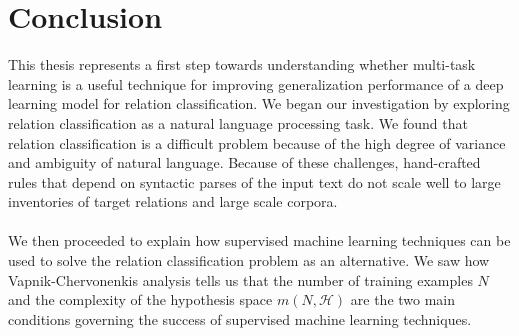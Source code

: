 \chapter{Conclusion}
This thesis represents a first step towards understanding whether multi-task learning is a useful technique for improving generalization performance of a deep learning model for relation classification. We began our investigation by exploring relation classification as a natural language processing task. We found that relation classification is a difficult problem because of the high degree of variance and ambiguity of natural language. Because of these challenges, hand-crafted rules that depend on syntactic parses of the input text do not scale well to large inventories of target relations and large scale corpora.
\\\\
We then proceeded to explain how supervised machine learning techniques can be used to solve the relation classification problem as an alternative. We saw how Vapnik-Chervonenkis analysis tells us that the number of training examples $N$ and the complexity of the hypothesis space $m(N, \mathcal{H})$ are the two main conditions governing the success of supervised machine learning techniques.

